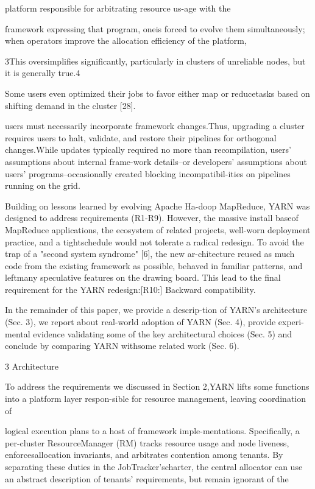 platform responsible for arbitrating resource us-age with the

framework expressing that program, oneis forced to evolve them simultaneously; when operators improve the allocation efficiency of the platform,

3This oversimplifies significantly, particularly in clusters of unreliable nodes, but it is generally true.4

Some users even optimized their jobs to favor either map or reducetasks based on shifting demand in the cluster [28].

users must necessarily incorporate framework changes.Thus, upgrading a cluster requires users to halt, validate, and restore their pipelines for orthogonal changes.While updates typically required no more than recompilation, users' assumptions about internal frame-work details--or developers' assumptions about users'
programs--occasionally created blocking incompatibil-ities on pipelines running on the grid.

Building on lessons learned by evolving Apache Ha-doop MapReduce, YARN was designed to address requirements (R1-R9). However, the massive install baseof MapReduce applications, the ecosystem of related
projects, well-worn deployment practice, and a tightschedule would not tolerate a radical redesign. To avoid
the trap of a "second system syndrome" [6], the new ar-chitecture reused as much code from the existing framework as possible, behaved in familiar patterns, and leftmany speculative features on the drawing board. This
lead to the final requirement for the YARN redesign:[R10:] Backward compatibility.

In the remainder of this paper, we provide a descrip-tion of YARN's architecture (Sec. 3), we report about
real-world adoption of YARN (Sec. 4), provide experi-mental evidence validating some of the key architectural
choices (Sec. 5) and conclude by comparing YARN withsome related work (Sec. 6).

3 Architecture

To address the requirements we discussed in Section 2,YARN lifts some functions
into a platform layer respon-sible for resource management, leaving coordination
of

logical execution plans to a host of framework imple-mentations. Specifically, a per-cluster ResourceManager
(RM) tracks resource usage and node liveness, enforcesallocation invariants, and arbitrates contention among
tenants. By separating these duties in the JobTracker'scharter, the central allocator can use an abstract description of tenants' requirements, but remain ignorant of the

